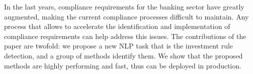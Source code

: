 In the last years, compliance requirements for the banking sector have greatly augmented, making the current compliance processes difficult to maintain. Any process that allows to accelerate the identification and implementation of compliance requirements can help address this issues. The contributions of the paper are twofold: we propose a new NLP task that is the investment rule detection, and a group of methods identify them. We show that the proposed methods are highly performing and fast, thus can be deployed in production.
